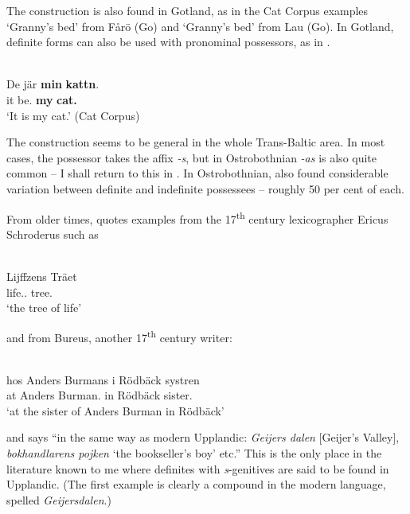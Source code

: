 The construction is also found in Gotland, as in the Cat Corpus examples  ‘Granny’s bed’ from Fårö (Go) and ‘Granny’s bed’ from Lau (Go). In Gotland, definite forms can also be used with pronominal possessors, as in .

\ea%
\\
\gll De  jär  \textbf{min} \textbf{kattn}.\\
it  be.{\prs}  \textbf{my} \textbf{cat.{}}\\
\glt  ‘It is my cat.’ (Cat Corpus)
\z

The construction seems to be general in the whole Trans-Baltic area. In most cases, the possessor takes the affix\textit{ {}-s}, but in Ostrobothnian\textit{ {}-as }is also quite common – I shall return to this in . In Ostrobothnian, \citet{ErikssonEtAl1999} also found considerable variation between definite and indefinite possessees – roughly 50 per cent of each. 

From older times, \citet[523]{Hesselman1908} quotes examples from the 17\textsuperscript{th} century lexicographer Ericus Schroderus such as

\ea%
\\
\gll Lijffzens  Träet\\
life.{\gen}.{}  tree.{}\\
\glt  ‘the tree of life’
\z

and from Bureus, another 17\textsuperscript{th} century writer:


\ea%
\\
\gll hos  Anders  Burmans  i  Rödbäck  systren\\
at  Anders  Burman.{\gen}  in  Rödbäck  sister.{}\\
\glt ‘at the sister of Anders Burman in Rödbäck’
\z

and says “in the same way as modern Upplandic: \textit{Geijers dalen }[Geijer’s Valley], \textit{bokhandlarens pojken} ‘the bookseller’s boy’ etc.” This is the only place in the literature known to me where definites with \textit{s}{}-genitives are said to be found in Upplandic. (The first example is clearly a compound in the modern language, spelled \textit{Geijersdalen}.)

